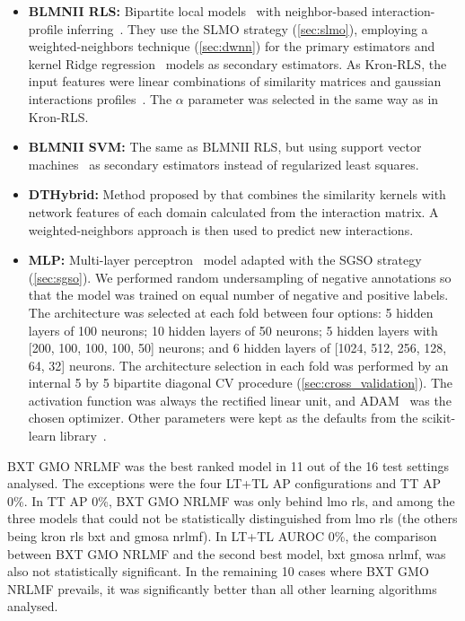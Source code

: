 \begin{itemize}
    \item \textbf{BLMNII RLS:} Bipartite local models~\cite{yamanishi2008prediction,bleakley2009supervised} with neighbor-based interaction-profile inferring~\cite{mei2013drug}. They use the SLMO strategy (\autoref{sec:slmo}), employing a weighted-neighbors technique (\autoref{sec:dwnn}) for the primary estimators and kernel Ridge regression~\cite{} models as secondary estimators.
    As Kron-RLS, the input features were linear combinations of similarity matrices and gaussian interactions profiles~\cite{vanlaarhoven2011gaussian}. The $\alpha$ parameter was selected in the same way as in Kron-RLS.

    \item \textbf{BLMNII SVM:} The same as BLMNII RLS, but using support vector machines~\cite{} as secondary estimators instead of regularized least squares.

    \item \textbf{DTHybrid:} Method proposed by \cite{dthybrid} that combines the similarity kernels with network features of each domain calculated from the interaction matrix. A weighted-neighbors approach is then used to predict new interactions.  %

    \item \textbf{MLP:} Multi-layer perceptron~\cite{} model adapted with the SGSO strategy (\autoref{sec:sgso}). We performed random undersampling of negative annotations so that the model was trained on equal number of negative and positive labels. 
    The architecture was selected at each fold between four options: 5 hidden layers of 100 neurons; 10 hidden layers of 50 neurons; 5 hidden layers with [200, 100, 100, 100, 50] neurons; and 6 hidden layers of [1024, 512, 256, 128, 64, 32] neurons. The architecture selection in each fold was performed by an internal 5 by 5 bipartite diagonal CV procedure (\autoref{sec:cross_validation}).
    The activation function was always the rectified linear unit, and ADAM~\cite{adam} was the chosen optimizer. Other parameters were kept as the defaults from the scikit-learn library~\cite{sklearn}.
\end{itemize}

BXT GMO NRLMF was the best ranked model in 11 out of the 16 test settings analysed. The exceptions were the four LT+TL AP configurations and TT AP 0\%. In TT AP 0\%, BXT GMO NRLMF was only behind lmo rls, and among the three models that could not be statistically distinguished from lmo rls (the others being kron rls bxt and gmosa nrlmf). In LT+TL AUROC 0\%, the comparison between BXT GMO NRLMF and the second best model, bxt gmosa nrlmf, was also not statistically significant. In the remaining 10 cases where BXT GMO NRLMF prevails, it was significantly better than all other learning algorithms analysed.

